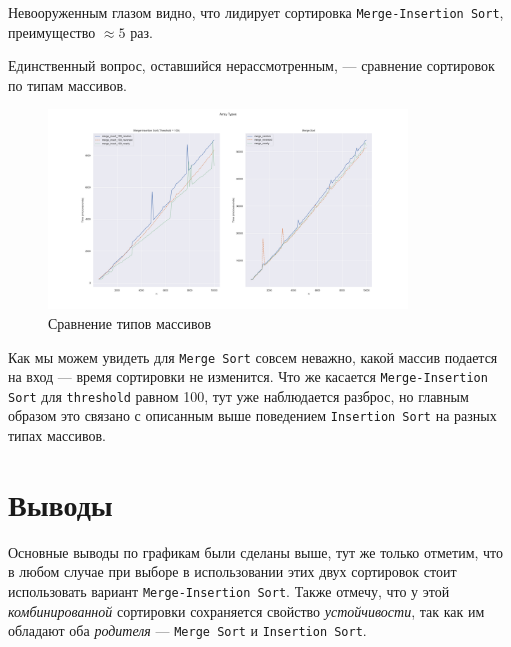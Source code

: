 \documentclass[11pt,a4paper]{scrarticle}
\theoremstyle{definition}
\begin{document}
Невооруженным глазом видно, что лидирует сортировка \texttt{Merge-Insertion Sort}, преимущество $\approx 5$ раз.

Единственный вопрос, оставшийся нерассмотренным, ---  сравнение сортировок по типам массивов.

\begin{figure}[htp]
	\centering
	\includegraphics[width=0.85\textwidth]{../static/array_types.png}
	\caption{Сравнение типов массивов}
	\label{fig:merge-vs-merge-ins}
\end{figure}
\FloatBarrier

Как мы можем увидеть для \texttt{Merge Sort} совсем неважно, какой массив подается на вход --- время сортировки не изменится. Что же касается \texttt{Merge-Insertion Sort} для \texttt{threshold} равном 100, тут уже наблюдается разброс, но главным образом это связано с описанным выше поведением \texttt{Insertion Sort} на разных типах массивов.

\section*{Выводы}

Основные выводы по графикам были сделаны выше, тут же только отметим, что в любом случае при выборе в использовании этих двух сортировок стоит использовать вариант \texttt{Merge-Insertion Sort}. Также отмечу, что у этой \emph{комбинированной} сортировки сохраняется свойство \emph{устойчивости}, так как им обладают оба \emph{родителя} --- \texttt{Merge Sort} и \texttt{Insertion Sort}.
\end{document}
